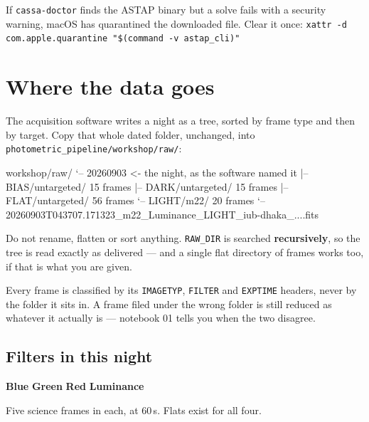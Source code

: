 \documentclass[11pt,a4paper]{article}
\newcommand{\cm}[1]{\texttt{\small #1}}
\newcommand{\cmt}[1]{\textcolor{inkfaint}{#1}}
\begin{document}
\begin{caution}
If \cm{cassa-doctor} finds the ASTAP binary but a solve fails with a security
warning, macOS has quarantined the downloaded file. Clear it once:
\cm{xattr -d com.apple.quarantine "\$(command -v astap\_cli)"}
\end{caution}
\section{Where the data goes}
The acquisition software writes a night as a tree, sorted by frame type and then by target.
Copy that whole dated folder, unchanged, into \cm{photometric\_pipeline/workshop/raw/}:

\begin{cmd}
\begin{cmdtext}
workshop/raw/
`-- 20260903                    \cmt{<- the night, as the software named it}
    |-- BIAS/untargeted/          \cmt{15 frames}
    |-- DARK/untargeted/          \cmt{15 frames}
    |-- FLAT/untargeted/          \cmt{56 frames}
    `-- LIGHT/m22/                \cmt{20 frames}
        `-- 20260903T043707.171323_m22_Luminance_LIGHT_iub-dhaka_....fits
\end{cmdtext}
\end{cmd}

Do not rename, flatten or sort anything. \cm{RAW\_DIR} is searched \textbf{recursively}, so the
tree is read exactly as delivered --- and a single flat directory of frames works too, if that
is what you are given.

\begin{note}
Every frame is classified by its \cm{IMAGETYP}, \cm{FILTER} and \cm{EXPTIME} headers, never by
the folder it sits in. A frame filed under the wrong folder is still reduced as whatever it
actually is --- notebook 01 tells you when the two disagree.
\end{note}

\subsection{Filters in this night}
\textcolor[HTML]{3E6FB8}{\sffamily\bfseries\small Blue}\quad
\textcolor[HTML]{3F8A55}{\sffamily\bfseries\small Green}\quad
\textcolor[HTML]{B4483A}{\sffamily\bfseries\small Red}\quad
\textcolor[HTML]{6C7885}{\sffamily\bfseries\small Luminance}\par
\vspace{4pt}
Five science frames in each, at 60\,s. Flats exist for all four.
\end{document}
